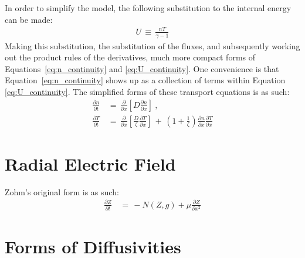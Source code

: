 In order to simplify the model, the following substitution to the internal energy can be made:
\begin{align} %
	U \,\equiv\, \frac{n T}{\gamma - 1} \label{eq:U_definition}
\end{align}
Making this substitution, the substitution of the fluxes, and subsequently working out the product rules of the derivatives, much more compact forms of Equations~\ref{eq:n_continuity} and \ref{eq:U_continuity}.
One convenience is that Equation~\ref{eq:n_continuity} shows up as a collection of terms within Equation \ref{eq:U_continuity}.
The simplified forms of these transport equations is as such:
\begin{align}
	\frac{\partial n}{\partial t} \,&=\, \frac{\partial}{\partial x} \left[D \frac{\partial n}{\partial x}\right]~,\label{eq:n_compact} \\
	\frac{\partial T}{\partial t} \,&=\, \frac{\partial}{\partial x} \left[\frac{D}{\zeta} \frac{\partial T}{\partial x}\right] \,+\, \left(1 + \frac{1}{\zeta}\right) \frac{\partial n}{\partial x} \frac{\partial T}{\partial x} \label{eq:T_compact}
\end{align}

\section{Radial Electric Field}\label{sec:Z_equation}
Zohm's original form is as such:
\begin{align}
	\frac{\partial Z}{\partial t} \,&=\, -N(Z,g) + \mu \frac{\partial Z}{\partial x^2}
\end{align}

\section{Forms of Diffusivities}\label{sec:diffusivities}


